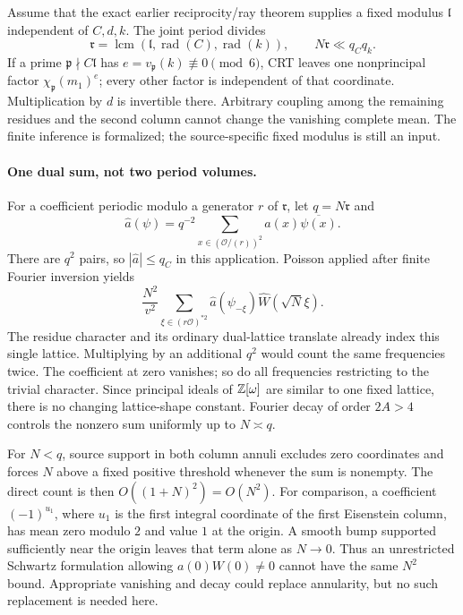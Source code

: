 Assume that the exact earlier reciprocity/ray theorem supplies a fixed
modulus $\mathfrak l$ independent of $C,d,k$. The joint period divides
\[
 \mathfrak r=\operatorname{lcm}
  (\mathfrak l,\operatorname{rad}(C),\operatorname{rad}(k)),
 \qquad N\mathfrak r\ll q_Cq_k.
\]
If a prime $\mathfrak p\nmid C\mathfrak l$ has
$e=v_{\mathfrak p}(k)\not\equiv0\pmod6$, CRT leaves one
nonprincipal factor $\chi_{\mathfrak p}(m_1)^e$; every other factor
is independent of that coordinate. Multiplication by $d$ is invertible
there. Arbitrary coupling among the remaining residues and the second
column cannot change the vanishing complete mean. The finite inference
is formalized; the source-specific fixed modulus is still an input.

\paragraph{One dual sum, not two period volumes.}
For a coefficient periodic modulo a generator $r$ of $\mathfrak r$,
let $q=N\mathfrak r$ and
\[
 \widehat a(\psi)=q^{-2}\sum_{x\in(\mathcal O/(r))^2}
                  a(x)\overline{\psi(x)}.
\]
There are $q^2$ pairs, so $|\widehat a|\le q_C$ in this application.
Poisson applied after finite Fourier inversion yields
\[
 \frac{N^2}{v^2}\sum_{\xi\in(r\mathcal O)^{*2}}
       \widehat a(\psi_{-\xi})\widehat W(\sqrt N\xi).
\]
The residue character and its ordinary dual-lattice translate already
index this single lattice. Multiplying by an additional $q^2$ would
count the same frequencies twice. The coefficient at zero vanishes;
so do all frequencies restricting to the trivial character.
Since principal ideals of $\mathbb Z[\omega]$ are similar to one fixed
lattice, there is no changing lattice-shape constant. Fourier decay
of order $2A>4$ controls the nonzero sum uniformly up to $N\asymp q$.

For $N<q$, source support in both column annuli excludes zero
coordinates and forces $N$ above a fixed positive threshold whenever
the sum is nonempty. The direct count is then $O((1+N)^2)=O(N^2)$.
For comparison, a coefficient
$(-1)^{u_1}$, where $u_1$ is the first integral coordinate of the first
Eisenstein column, has mean zero modulo $2$ and value $1$ at the origin.
A smooth bump supported sufficiently near the origin leaves that term
alone as $N\to0$. Thus an unrestricted Schwartz formulation allowing
$a(0)W(0)\ne0$ cannot have the same $N^2$ bound. Appropriate vanishing
and decay could replace annularity, but no such replacement is needed here.

